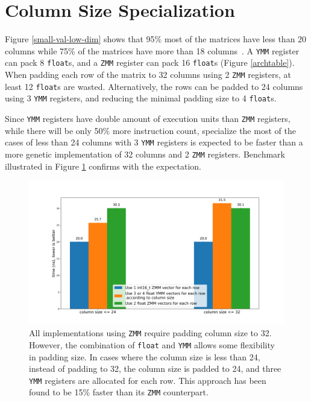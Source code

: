 \documentclass[logo,bsc,singlespacing,parskip]{infthesis}
\newcommand{\dtfloat}{\texttt{float}}
\newcommand{\ymm}{\texttt{YMM}}
\newcommand{\zmm}{\texttt{ZMM}}
\begin{document}
\section{Column Size Specialization}

Figure \ref{small-val-low-dim} shows that 95\% most of the matrices have less
than 20 columns while 75\% of the matrices have more than 18
columns~\cite{FPL1}. A \ymm{} register can pack 8 \dtfloat{}s, and a \zmm{}
register can pack 16 \dtfloat{}s (Figure \ref{archtable}). When padding each row
of the matrix to 32 columns using 2 \zmm{} registers, at least 12 \dtfloat{}s
are wasted. Alternatively, the rows can be padded to 24 columns using 3 \ymm{}
registers, and reducing the minimal padding size to 4 \dtfloat{}s.

Since \ymm{} registers have double amount of execution units than \zmm{}
registers, while there will be only 50\% more instruction count, specialize the
most of the cases of less than 24 columns with 3 \ymm{} registers is expected to
be faster than a more genetic implementation of 32 columns and 2 \zmm{}
registers. Benchmark illustrated in Figure \ref{fig:specialization} confirms
with the expectation. 

\begin{figure}[H]
    \begin{center}
        \includegraphics[width=\linewidth]{image/specialize-i16-f32-v2.png}
    \end{center}
    \caption{All implementations using \zmm{} require padding column size to 32.
    However, the combination of \dtfloat{} and \ymm{} allows some flexibility
    in padding size. 
    In cases where the column size is less than 24, instead of padding to 32, 
    the column size is padded to 24, and three \ymm{} registers are allocated for each row.
    This approach has been found to be 15\% faster than its \zmm{} counterpart.}
    \label{fig:specialization}
\end{figure}
\end{document}

